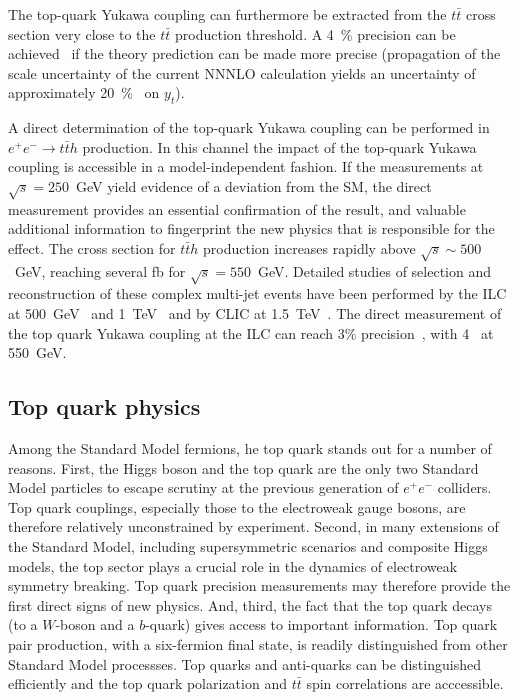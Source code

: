 The top-quark Yukawa coupling can furthermore be extracted from the $t\bar{t}$
cross section very close to the $t\bar{t}$ production threshold. A 4~\% precision can be achieved~\cite{Horiguchi:2013wra}
if the theory prediction can be made more precise (propagation of the scale uncertainty of the current NNNLO calculation yields
an uncertainty of approximately 20~\%~\cite{Vos:2016til} on $y_t$).

A direct determination of the top-quark Yukawa coupling can be performed in $e^+e^- \rightarrow t\bar{t}h$ production.
In this channel the impact of the top-quark Yukawa coupling is accessible in a model-independent fashion. If the
measurements at $\sqrt{s}=250$~GeV yield evidence of a deviation from the SM, the direct measurement provides
an essential confirmation of the result, and valuable additional information to fingerprint the new physics that
is responsible for the effect. The cross section for $t\bar{t}h$ production increases rapidly above $\sqrt{s} \sim 500 $~GeV,
reaching several fb for $\sqrt{s} = 550$~GeV. Detailed studies of selection and reconstruction of these complex multi-jet events
have been performed by the ILC at 500~GeV~\cite{Yonamine:2011jg} and 1~TeV~\cite{Price:2014oca} and by CLIC
at 1.5~TeV~\cite{Abramowicz:2018rjq}. The direct measurement of the top quark Yukawa coupling at the ILC can reach 3\%
precision~\cite{Fujii:2015jha}, with 4~\iab{} at 550~GeV.




\subsection{Top quark physics}
\label{subsec:highE:top}

Among the Standard Model fermions, he top quark stands out for a number of reasons. First, the Higgs boson
and the top quark are the only two Standard Model particles to escape scrutiny at the previous generation
of $e^+e^-$ colliders. Top quark couplings, especially those to the electroweak gauge bosons, are therefore
relatively unconstrained by experiment. Second, in many extensions of the Standard Model, including
supersymmetric scenarios and composite Higgs models, the top sector plays a crucial role in the dynamics
of electroweak symmetry breaking. Top quark precision measurements may therefore provide the first direct signs of new physics.
And, third, the fact that the top quark decays (to a $W$-boson and a $b$-quark) gives access to important information. Top quark
pair production, with a six-fermion final state, is readily distinguished from other Standard Model processses. Top quarks
and anti-quarks can be distinguished efficiently and the top quark polarization and $t\bar{t}$ spin correlations are acccessible. 


